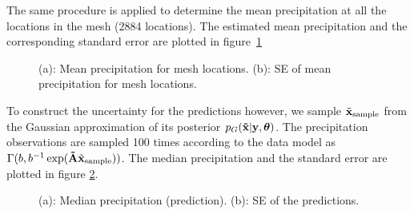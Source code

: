 \documentclass[a4paper,10pt]{article}
\def\btA{{\bf \tilde A}}
\def\bx{{\bf x}}
\def\by{{\bf y}}
\def\btx{{\bf{\tilde x}}}
\def\btheta{{\boldsymbol \theta}}
\def\txsample{{\tilde \bx_{\mathrm{sample}}}}
\begin{document}
The same procedure is applied to determine the mean precipitation at all the locations in the mesh (2884 locations). The estimated mean precipitation and the corresponding standard error are plotted in figure~\ref{fig:mesh}
\begin{figure}[ht]
\centering
  \qquad
  \caption{(a): Mean precipitation for mesh locations. (b): SE of mean precipitation for mesh locations.}
\label{fig:mesh}
\end{figure}

To construct the uncertainty for the predictions however, we sample $\txsample$ from the Gaussian approximation of its posterior $p_G(\btx|\by, \btheta)$. The precipitation observations are sampled 100 times according to the data model as $\Gamma(b, b^{-1} \exp(\btA \txsample))$. The median precipitation and the standard error are plotted in figure \ref{fig:meshpred}.
\begin{figure}[H]
\centering
  \qquad
  \caption{(a): Median precipitation (prediction). (b): SE of the predictions.}
\label{fig:meshpred}
\end{figure}
\end{document}
